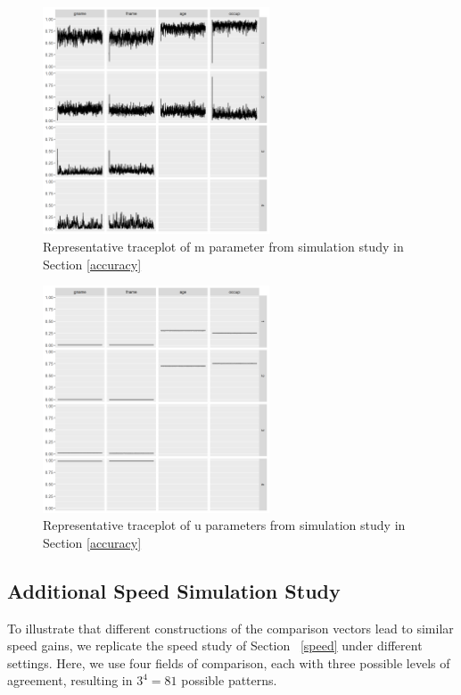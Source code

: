\documentclass[ba]{imsart}
\begin{document}
	
	\begin{figure}[!h]
		\begin{center}
			\includegraphics[width=0.6\textwidth]{../notes/figures/sim_m_trace} 
			\caption{Representative traceplot of m parameter from simulation study in Section \ref{accuracy}}\label{fig:sim_m_trace}
		\end{center}
	\end{figure}
	
	\begin{figure}[!h]
		\begin{center}
			\includegraphics[width=0.6\textwidth]{../notes/figures/sim_u_trace} 
			\caption{Representative traceplot of u parameters from simulation study in Section \ref{accuracy}}\label{fig:sim_u_trace}
		\end{center}
	\end{figure}

\clearpage

	\hypertarget{appendix-speed}{%
	\subsection{Additional Speed Simulation Study}\label{app:appendix-speed}}
	To illustrate that different constructions of the comparison vectors lead to similar speed gains, we replicate the speed study of Section ~\ref{speed} under different settings. Here, we use four fields of comparison, each with three possible levels of agreement, resulting in $3^4 = 81$ possible patterns.
	
\end{document}
